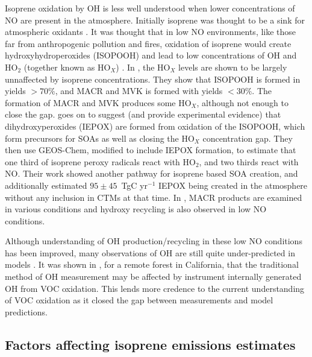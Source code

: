     
    Isoprene oxidation by OH is less well understood when lower concentrations of NO are present in the atmosphere.
    Initially isoprene was thought to be a sink for atmospheric oxidants \citep[eg.]{Guenther2000}.
    It was thought that in low NO environments, like those far from anthropogenic pollution and fires, oxidation of isoprene would create hydroxyhydroperoxides (ISOPOOH) and lead to low concentrations of OH and HO$_2$ (together known as HO$_X$) \citet{Paulot2009b}.
    In \citet{Paulot2009b}, the HO$_X$ levels are shown to be largely unnaffected by isoprene concentrations.
    They show that ISOPOOH is formed in yields $> 70\%$, and MACR and MVK is formed with yields $< 30\%$.
    The formation of MACR and MVK produces some HO$_X$, although not enough to close the gap.
    \citet{Paulot2009b} goes on to suggest (and provide experimental evidence) that dihydroxyperoxides (IEPOX) are formed from oxidation of the ISOPOOH, which form precursors for SOAs as well as closing the HO$_X$ concentration gap.
    They then use GEOS-Chem, modified to include IEPOX formation, to estimate that one third of isoprene peroxy radicals react with HO$_2$, and two thirds react with NO. 
    Their work showed another pathway for isoprene based SOA creation, and additionally estimated $95 \pm 45$~TgC yr$^{-1}$ IEPOX being created in the atmosphere without any inclusion in CTMs at that time.
    In \cite{Crounse2012}, MACR products are examined in various conditions and hydroxy recycling is also observed in low NO conditions. 
    
    Although understanding of OH production/recycling in these low NO conditions has been improved, many observations of OH are still quite under-predicted in models \citep{Mao2012}.
    It was shown in \citet{Mao2012}, for a remote forest in California, that the traditional method of OH measurement may be affected by instrument internally generated OH from VOC oxidation.
    This lends more credence to the current understanding of VOC oxidation as it closed the gap between measurements and model predictions.
  \subsection{Factors affecting isoprene emissions estimates}
    
